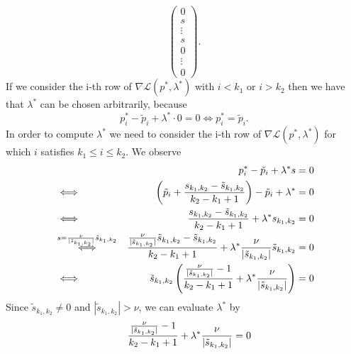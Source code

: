 \documentclass[abstracton]{scrreprt}
\newenvironment{proof}[1][Proof]{\begin{trivlist}
\item[\hskip \labelsep {\bfseries #1}]}{\end{trivlist}}
\begin{document}
\begin{proof}
$$\begin{pmatrix}
                            0 \\
                            s \\
                            \vdots \\
                            s \\
                            0 \\
                            \vdots \\
                            0
                        \end{pmatrix}.
                $$
                If we consider the i-th row of $\nabla \mathcal{L}(p^{\ast}, \lambda^{\ast})$ with $i < k_{1}$ or $i > k_{2}$ then we have that $\lambda^{\ast}$ can be chosen arbitrarily, because
                    $$
                        p^{\ast}_{i} - \tilde{p}_{i} + \lambda^{\ast} \cdot 0 = 0 \iff  p^{\ast}_{i} = \tilde{p}_{i}.
                    $$
                In order to compute $\lambda^{\ast}$ we need to consider the i-th row of $\nabla \mathcal{L}(p^{\ast}, \lambda^{\ast})$ for which $i$ satisfies $k_{1} \le i \le k_{2}$. We observe
                    \begin{eqnarray}
                        &&p^{\ast}_{i} - \tilde{p}_{i} + \lambda^{\ast} s = 0 \notag \\
                        &\iff& \left(\tilde{p}_{i} + \frac{s_{k_{1}, k_{2}} - \tilde{s}_{k_{1}, k_{2}}}{k_{2} - k_{1} + 1}\right) - \tilde{p}_{i} + \lambda^{\ast}  = 0 \notag \\
                        &\iff& \frac{s_{k_{1}, k_{2}} - \tilde{s}_{k_{1}, k_{2}}}{k_{2} - k_{1} + 1} + \lambda^{\ast}s_{k_{1}, k_{2}} = 0 \notag \\
                        &\overset{s = \frac{\nu}{|\tilde{s}_{k_{1}, k_{2}}|}\tilde{s}_{k_{1}, k_{2}}}{\iff}& \frac{\frac{\nu}{|\tilde{s}_{k_{1}, k_{2}}|} \tilde{s}_{k_{1}, k_{2}} - \tilde{s}_{k_{1}, k_{2}}}{k_{2} - k_{1} + 1} + \lambda^{\ast}\frac{\nu}{|\tilde{s}_{k_{1}, k_{2}}|} \tilde{s}_{k_{1}, k_{2}} = 0 \notag \\
                        &\iff& \tilde{s}_{k_{1}, k_{2}} \left( \frac{\frac{\nu}{|\tilde{s}_{k_{1}, k_{2}}|} - 1}{k_{2} - k_{1} + 1} + \lambda^{\ast}\frac{\nu}{|\tilde{s}_{k_{1}, k_{2}}|} \right) = 0 \notag
                    \end{eqnarray}
                Since $\tilde{s}_{k_{1}, k_{2}} \neq 0$ and $|\tilde{s}_{k_{1}, k_{2}}| > \nu$, we can evaluate $\lambda^{\ast}$ by
                    \begin{eqnarray}
                        && \frac{\frac{\nu}{|\tilde{s}_{k_{1}, k_{2}}|} - 1}{k_{2} - k_{1} + 1} + \lambda^{\ast}\frac{\nu}{|\tilde{s}_{k_{1}, k_{2}}|} = 0 \notag \\

\end{eqnarray}
\end{proof}
\end{document}
